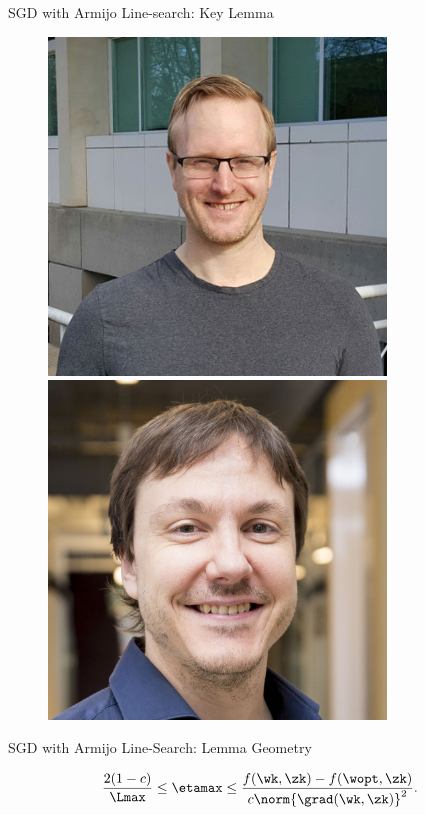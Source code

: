 \documentclass[mathserif,notheorems, hyperref={colorlinks, citecolor=blue, urlcolor=blue, linkcolor=blue}]{beamer}
\begin{document}
\begin{frame}{SGD with Armijo Line-search: Key Lemma}
\begin{minipage}[t]{0.15\textwidth}
\begin{figure}[t]
			\vspace{0.4ex}
			\includegraphics[width=0.8\textwidth]{collaborators/mark}

			\vspace{0.4ex}
			\includegraphics[width=0.8\textwidth]{collaborators/simon}
		\end{figure}
	\end{minipage}

\end{frame}

\begin{frame}{SGD with Armijo Line-Search: Lemma Geometry}
	\Large

	\[  \frac{2 (1-c)}{\Lmax} \leq \etamax \leq \frac{f(\wk, \zk) - f(\wopt, \zk)}{c \norm{\grad(\wk, \zk)}^2}. \]

	\vspace{1ex}

	\begin{figure}[]
		\centering
		
	\end{figure}

\end{frame}
\end{document}
